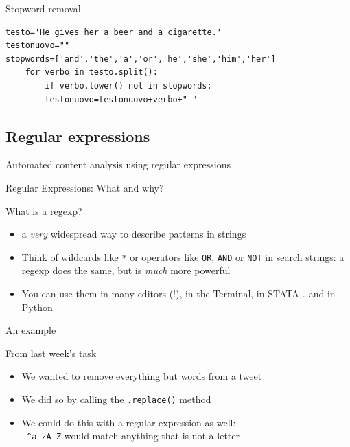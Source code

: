 \documentclass{beamer}
\begin{document}
\begin{frame}[fragile]{Stopword removal}
\begin{lstlisting}
testo='He gives her a beer and a cigarette.'
testonuovo=""
stopwords=['and','the','a','or','he','she','him','her']
    for verbo in testo.split():
        if verbo.lower() not in stopwords:
        testonuovo=testonuovo+verbo+" "
\end{lstlisting}
\end{frame}










\subsection{Regular expressions}

\begin{frame}
Automated content analysis using regular expressions
\end{frame}

\begin{frame}{Regular Expressions: What and why?}
\begin{block}{What is a regexp?}
\begin{itemize}
\item<1-> a \emph{very} widespread way to describe patterns in strings
\item<2-> Think of wildcards like {\tt{*}} or operators like {\tt{OR}}, {\tt{AND}} or {\tt{NOT}} in search strings: a regexp does the same, but is \emph{much} more powerful
\item<3-> You can use them in many editors (!), in the Terminal, in STATA \ldots and in Python
\end{itemize}
\end{block}
\end{frame}

\begin{frame}{An example}
\begin{block}{From last week's task}
\begin{itemize}
\item We wanted to remove everything but words from a tweet
\item We did so by calling the \texttt{.replace()} method
\item We could do this with a regular expression as well: \\
{\tt{ \lbrack \^{}a-zA-Z\rbrack}} would match anything that is not a letter
\end{itemize}
\end{block}
\end{frame}
\end{document}
